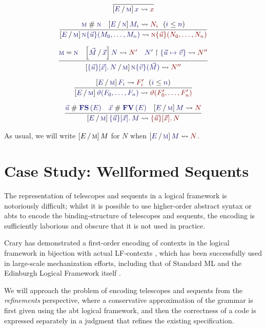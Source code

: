 \documentclass[11pt]{article}
\theoremstyle{definition}
\theoremstyle{remark}
\numberwithin{equation}{section}
\def\IModeColorName{MidnightBlue}
\def\OModeColorName{Maroon}
\newcommand\IMode[1]{{\color{\IModeColorName}{#1}}}
\newcommand\OMode[1]{{\color{\OModeColorName}{#1}}}
\newcommand\HypJ[2]{#1\ \ (#2)}
\newcommand\MkSet[1]{\left\{#1\right\}}
\newcommand\MkBTm[3]{\{#1\}[#2].\, #3}
\newcommand\Leq[2]{\IMode{#1}\leq\IMode{#2}}
\newcommand\MV[1]{\textsc{#1}}
\newcommand\MApp[3]{#1\{#2\}(#3)}
\newcommand\App[2]{#1(#2)}
\newcommand\FV[1]{\mathbf{FV}\left(#1\right)}
\newcommand\FS[1]{\mathbf{FS}\left(#1\right)}
\newcommand\Rename[2]{
  #2\upharpoonright #1
}
\newcommand\IsRenaming[3]{
  \Rename{\IMode{#1}}{\IMode{#2}}%
  \leadsto\OMode{#3}%
}
\newcommand\Subst[3]{
  \left[#1\, /\, #2\right]#3%
}
\newcommand\IsSubst[4]{%
  \Subst{\IMode{#1}}{\IMode{#2}}{\IMode{#3}}%
  \leadsto\OMode{#4}%
}
\newcommand\IsEq[2]{\IMode{#1} = \IMode{#2}}
\newcommand\IsApart[2]{\IMode{#1} \mathrel{\#} \IMode{#2}}
\begin{document}
\begin{gather*}
  \infer{
    \IsSubst{E}{\MV{m}}{x}{x}
  }{
  }\\[6pt]
  \infer{
    \IsSubst{E}{\MV{m}}{
      \MApp{\MV{n}}{\vec{u}}{M_0,\dots,M_n}
    }{
      \MApp{\MV{n}}{\vec{u}}{N_0,\dots,N_n}
    }
  }{
    \IsApart{\MV{m}}{\MV{n}} &
    \HypJ{
      \IsSubst{E}{\MV{n}}{M_i}{N_i}
    }{
      \Leq{i}{n}
    }
  }\\[6pt]
  \infer{
    \IsSubst{
      \MkBTm{\vec{u}}{\vec{x}}{N}
    }{\MV{m}}{
      \MApp{\MV{n}}{\vec{v}}{\vec{M}}
    }{
      N''
    }
  }{
    \IsEq{\MV{m}}{\MV{n}} &
    \IsSubst{\vec{M}}{\vec{x}}{N}{N'} &
    \IsRenaming{\MkSet{\vec{u}\mapsto\vec{v}}}{N'}{N''}
  }\\[6pt]
  \infer{
    \IsSubst{E}{\MV{m}}{
      \App{\vartheta}{F_0,\dots,F_n}
    }{
      \App{\vartheta}{F'_0,\dots,F'_n}
    }
  }{
    \HypJ{
      \IsSubst{E}{\MV{m}}{F_i}{F'_i}
    }{
      \Leq{i}{n}
    }
  }\\[6pt]
  \infer{
    \IsSubst{E}{\MV{m}}{
      \MkBTm{\vec{u}}{\vec{x}}{M}
    }{
      \MkBTm{\vec{u}}{\vec{x}}{N}
    }
  }{
    \IsApart{\vec{u}}{\FS{E}} &
    \IsApart{\vec{x}}{\FV{E}} &
    \IsSubst{E}{\MV{m}}{M}{N}
  }
\end{gather*}

As usual, we will write $\Subst{E}{\MV{m}}{M}$ for $N$ when
$\IsSubst{E}{\MV{m}}{M}{N}$.

\section{Case Study: Wellformed Sequents}

The representation of telescopes and sequents in a logical framework is
notoriously difficult; whilst it is possible to use higher-order abstract
syntax or abts to encode the binding-structure of telescopes
and sequents, the encoding is sufficiently laborious and obscure that it is not
used in practice.

Crary has demonstrated a first-order encoding of contexts in the logical
framework in bijection with actual LF-contexts \cite{crary:2009}, which has
been successfully used in large-scale mechanization efforts, including that of
Standard ML \cite{lee-crary-harper:2007} and the Edinburgh Logical Framework
itself \cite{martens-crary:2012}.


We will approach the problem of encoding telescopes and sequents from the
\emph{refinements} perspective, where a conservative approximation of the
grammar is first given using the abt logical framework, and then the
correctness of a code is expressed separately in a judgment that refines the
existing specification.
\end{document}
